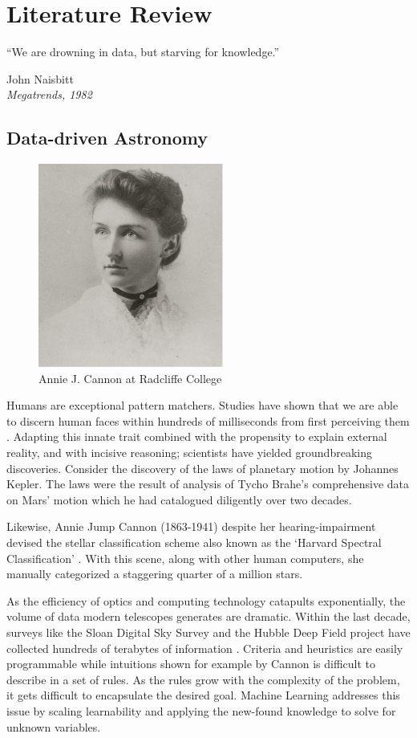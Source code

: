 \section{Literature Review}
\epigraph{\justify``We are drowning in data, but starving for knowledge.''}{John Naisbitt\\\textit{Megatrends, 1982}}

\subsection{Data-driven Astronomy}\label{sec:dda}
\begin{figure}
	\centering
	\vspace{-\intextsep}
	\includegraphics[width=.2\textwidth, keepaspectratio]{images/misc/cannon.png}
	\caption{Annie J. Cannon at Radcliffe College \parencite{schlesinger_library_portrait_2016}}
	\vspace{-15pt}
\end{figure}
Humans are exceptional pattern matchers. Studies have shown that we are able to discern human faces within hundreds of milliseconds from first perceiving them \parencite{caharel_face_2013, barragan-jason_neural_2015}. Adapting this innate trait combined with the propensity to explain external reality, and with incisive reasoning; scientists have yielded groundbreaking discoveries. Consider the discovery of the laws of planetary motion by Johannes Kepler. The laws were the result of analysis of Tycho Brahe's comprehensive data on Mars' motion which he had catalogued diligently over two decades.

Likewise, Annie Jump Cannon (1863-1941) despite her hearing-impairment devised the stellar classification scheme also known as the `Harvard Spectral Classification' \parencite{wolbach_library_of_the_harvard-smithsonian_center_for_astrophysics_astronomy_2019}. With this scene, along with other human computers, she manually categorized a staggering quarter of a million stars.

As the efficiency of optics and computing technology catapults exponentially, the volume of data modern telescopes generates are dramatic. Within the last decade, surveys like the Sloan Digital Sky Survey and the Hubble Deep Field project have collected hundreds of terabytes of information \parencite[43]{ivezic_statistics_2014}. Criteria and heuristics are easily programmable while intuitions shown for example by Cannon is difficult to describe in a set of rules. As the rules grow with the complexity of the problem, it gets difficult to encapsulate the desired goal. Machine Learning addresses this issue by scaling learnability and applying the new-found knowledge to solve for unknown variables.

